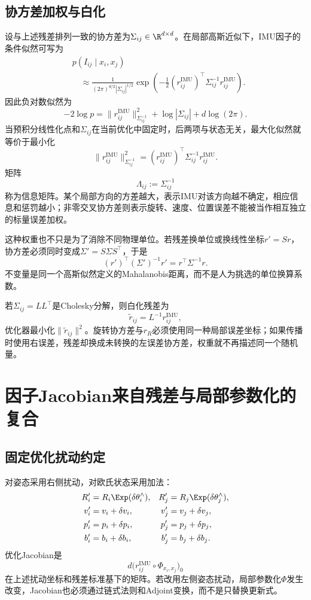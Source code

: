 \subsection{协方差加权与白化}

设与上述残差排列一致的协方差为$\Sigma_{ij}\in\R^{d\times d}$。在局部高斯近似下，IMU因子的条件似然可写为
\[
\boxed{
\begin{aligned}
    &p(I_{ij}\mid x_i,x_j)\\
    &\quad\approx
    \frac{1}{(2\pi)^{d/2}|\Sigma_{ij}|^{1/2}}
    \exp\left(
      -\frac12
      (r_{ij}^{\mathrm{IMU}})^\top
      \Sigma_{ij}^{-1}r_{ij}^{\mathrm{IMU}}
    \right).
\end{aligned}
}
\]
因此负对数似然为
\[
    -2\log p
    =\|r_{ij}^{\mathrm{IMU}}\|_{\Sigma_{ij}^{-1}}^2
      +\log|\Sigma_{ij}|+d\log(2\pi).
\]
当预积分线性化点和$\Sigma_{ij}$在当前优化中固定时，后两项与状态无关，最大化似然就等价于最小化
\[
    \|r_{ij}^{\mathrm{IMU}}\|_{\Sigma_{ij}^{-1}}^2
    =(r_{ij}^{\mathrm{IMU}})^\top
      \Sigma_{ij}^{-1}r_{ij}^{\mathrm{IMU}}.
\]
矩阵
\[
    \Lambda_{ij}:=\Sigma_{ij}^{-1}
\]
称为信息矩阵。某个局部方向的方差越大，表示IMU对该方向越不确定，相应信息和惩罚越小；非零交叉协方差则表示旋转、速度、位置误差不能被当作相互独立的标量误差加权。

这种权重也不只是为了消除不同物理单位。若残差换单位或换线性坐标$r'=Sr$，协方差必须同时变成$\Sigma'=S\Sigma S^\top$，于是
\[
    (r')^\top(\Sigma')^{-1}r'
    =r^\top\Sigma^{-1}r.
\]
不变量是同一个高斯似然定义的Mahalanobis距离，而不是人为挑选的单位换算系数。

若$\Sigma_{ij}=LL^\top$是Cholesky分解，则白化残差为
\[
    \widetilde r_{ij}=L^{-1}r_{ij}^{\mathrm{IMU}},
\]
优化器最小化$\|\widetilde r_{ij}\|^2$。旋转协方差与$r_R$必须使用同一种局部误差坐标；如果传播时使用右误差，残差却换成未转换的左误差协方差，权重就不再描述同一个随机量。


\section{因子Jacobian来自残差与局部参数化的复合}

\subsection{固定优化扰动约定}

对姿态采用右侧扰动，对欧氏状态采用加法：
\[
\begin{aligned}
    R_i'&=R_i\Exp(\delta\theta_i^\wedge),
    &R_j'&=R_j\Exp(\delta\theta_j^\wedge),\\
    v_i'&=v_i+\delta v_i,
    &v_j'&=v_j+\delta v_j,\\
    p_i'&=p_i+\delta p_i,
    &p_j'&=p_j+\delta p_j,\\
    b_i'&=b_i+\delta b_i,
    &b_j'&=b_j+\delta b_j.
\end{aligned}
\]
优化Jacobian是
\[
    d\bigl(r_{ij}^{\mathrm{IMU}}\circ\Phi_{x_i,x_j}\bigr)_0
\]
在上述扰动坐标和残差标准基下的矩阵。若改用左侧姿态扰动，局部参数化$\Phi$发生改变，Jacobian也必须通过链式法则和Adjoint变换，而不是只替换更新式。

